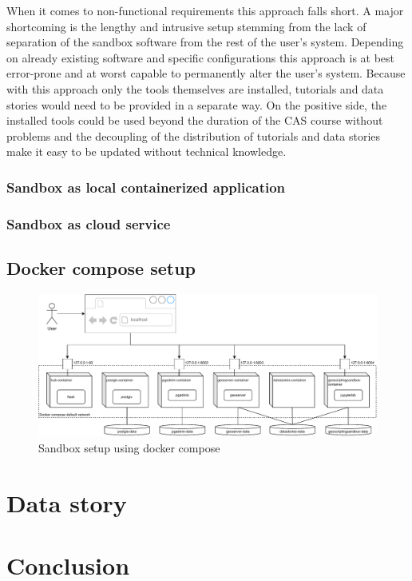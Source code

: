 \documentclass[11pt, a4paper, oneside, parskip=full-]{scrartcl}
\begin{document}
When it comes to non-functional requirements this approach falls short. A major
shortcoming is the lengthy and intrusive setup stemming from the lack of
separation of the sandbox software from the rest of the user's system. Depending
on already existing software and specific configurations this approach is at
best error-prone and at worst capable to permanently alter the user's system.
Because with this approach only the tools themselves are installed, tutorials
and data stories would need to be provided in a separate way. On the positive
side, the installed tools could be used beyond the duration of the CAS course
without problems and the decoupling of the distribution of tutorials and data
stories make it easy to be updated without technical knowledge.


\subsubsection*{Sandbox as local containerized application}


\subsubsection*{Sandbox as cloud service}


\subsection{Docker compose setup}
\begin{figure}[H]
  \centering
  \includegraphics[width=1\textwidth]{composeSetup}
  \caption{Sandbox setup using docker compose}
  \label{fig:sandboxsetup}
\end{figure}

\section{Data story}

\section{Conclusion}
\end{document}
